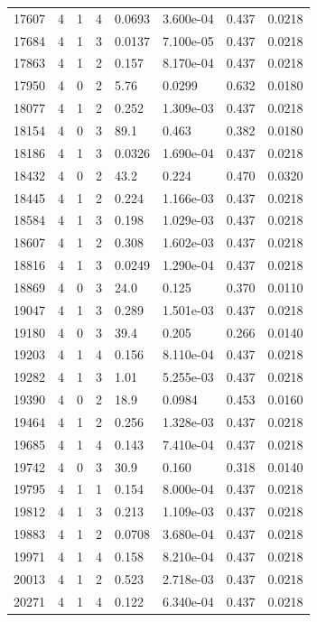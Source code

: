 \documentclass[preview]{standalone}
\begin{document}
{{{{{\begin{tabular}{L{1.2cm}C{1.2cm} C{0.3cm}C{0.5cm} C{1.4cm}C{1.4cm} C{1.4cm}C{1.4cm}}
  17607  &     4  & 1     &  4 &  0.0693  & 3.600e-04  & 0.437 &  0.0218   \\ 
  17684  &     4  & 1     &  3 &  0.0137  & 7.100e-05  & 0.437 &  0.0218   \\ 
  17863  &     4  & 1     &  2 &  0.157  & 8.170e-04  & 0.437 &  0.0218   \\ 
  17950  &     4  & 0     &  2 &  5.76  & 0.0299  & 0.632 &  0.0180   \\ 
  18077  &     4  & 1     &  2 &  0.252  & 1.309e-03  & 0.437 &  0.0218   \\ 
  18154  &     4  & 0     &  3 &  89.1  & 0.463  & 0.382 &  0.0180   \\ 
  18186  &     4  & 1     &  3 &  0.0326  & 1.690e-04  & 0.437 &  0.0218   \\ 
  18432  &     4  & 0     &  2 &  43.2  & 0.224  & 0.470 &  0.0320   \\ 
  18445  &     4  & 1     &  2 &  0.224  & 1.166e-03  & 0.437 &  0.0218   \\ 
  18584  &     4  & 1     &  3 &  0.198  & 1.029e-03  & 0.437 &  0.0218   \\ 
  18607  &     4  & 1     &  2 &  0.308  & 1.602e-03  & 0.437 &  0.0218   \\ 
  18816  &     4  & 1     &  3 &  0.0249  & 1.290e-04  & 0.437 &  0.0218   \\ 
  18869  &     4  & 0     &  3 &  24.0  & 0.125  & 0.370 &  0.0110   \\ 
  19047  &     4  & 1     &  3 &  0.289  & 1.501e-03  & 0.437 &  0.0218   \\ 
  19180  &     4  & 0     &  3 &  39.4  & 0.205  & 0.266 &  0.0140   \\ 
  19203  &     4  & 1     &  4 &  0.156  & 8.110e-04  & 0.437 &  0.0218   \\ 
  19282  &     4  & 1     &  3 &  1.01  & 5.255e-03  & 0.437 &  0.0218   \\ 
  19390  &     4  & 0     &  2 &  18.9  & 0.0984  & 0.453 &  0.0160   \\ 
  19464  &     4  & 1     &  2 &  0.256  & 1.328e-03  & 0.437 &  0.0218   \\ 
  19685  &     4  & 1     &  4 &  0.143  & 7.410e-04  & 0.437 &  0.0218   \\ 
  19742  &     4  & 0     &  3 &  30.9  & 0.160  & 0.318 &  0.0140   \\ 
  19795  &     4  & 1     &  1 &  0.154  & 8.000e-04  & 0.437 &  0.0218   \\ 
  19812  &     4  & 1     &  3 &  0.213  & 1.109e-03  & 0.437 &  0.0218   \\ 
  19883  &     4  & 1     &  2 &  0.0708  & 3.680e-04  & 0.437 &  0.0218   \\ 
  19971  &     4  & 1     &  4 &  0.158  & 8.210e-04  & 0.437 &  0.0218   \\ 
  20013  &     4  & 1     &  2 &  0.523  & 2.718e-03  & 0.437 &  0.0218   \\ 
  20271  &     4  & 1     &  4 &  0.122  & 6.340e-04  & 0.437 &  0.0218   \\ 
\hline 
\end{tabular} 

}}}}}
\end{document}
